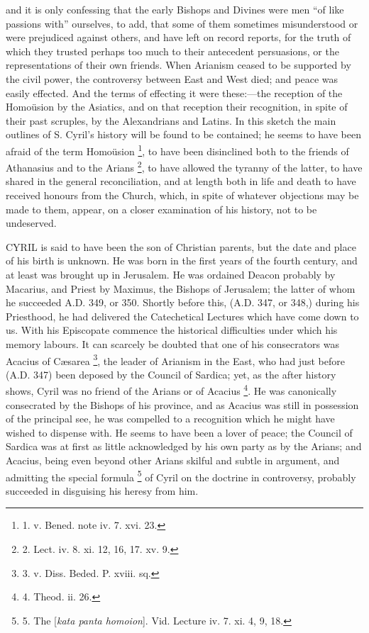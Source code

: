 and it is only confessing that the early Bishops and Divines were men ``of
like passions with'' ourselves, to add, that some of them sometimes
misunderstood or were prejudiced against others, and have left on
record reports, for the truth of which they trusted perhaps too much
to their antecedent persuasions, or the representations of their own
friends. When Arianism ceased to be supported by the civil power, the
controversy between East and West died; and peace was easily effected.
And the terms of effecting it were these:—the reception of the Homoüsion
by the Asiatics, and on that reception their recognition, in spite of
their past scruples, by the Alexandrians and Latins. In this sketch
the main outlines of S. Cyril's history will be found to be contained;
he seems to have been afraid of the term Homoüsion \footnote{1. v. Bened. note iv. 7. xvi.
23.}, to have been disinclined both to the friends of Athanasius and
to the Arians \footnote{2. Lect.
iv. 8. xi. 12, 16, 17. xv. 9.}, to have
allowed the tyranny of the latter, to have shared in the general
reconciliation, and at length both in life and death to have received
honours from the Church, which, in spite of whatever objections
may be made to them, appear, on a closer examination of his history,
not to be undeserved.

CYRIL is said to have
been the son of Christian parents, but the date and place of his birth
is unknown. He was born in the first years of the fourth century, and
at least was brought up in Jerusalem. He was ordained Deacon probably
by Macarius, and Priest by Maximus, the Bishops of Jerusalem; the
latter of whom he succeeded A.D.
349, or 350. Shortly before this, (A.D.
347, or 348,) during his Priesthood, he had delivered the Catechetical
Lectures which have come down to us. With his Episcopate commence the
historical difficulties under which his memory labours. It can
scarcely be doubted that one of his consecrators was Acacius of Cæsarea
\footnote{3. v. Diss.
Beded. P. xviii. sq.}, the leader of Arianism
in the East, who had just before (A.D. 347) been
deposed by the Council of Sardica; yet, as the after history shows,
Cyril was no friend of the Arians or of Acacius \footnote{4. Theod.
ii. 26.}. He was canonically consecrated by the Bishops of his province,
and as Acacius was still in possession of the principal see, he was
compelled to a recognition which he might have wished to dispense
with. He seems to have been a lover of peace; the Council of Sardica
was at first as little acknowledged by his own party as by the Arians;
and Acacius, being even beyond other Arians skilful and subtle in
argument, and admitting the special formula \footnote{5. The [\emph{kata
panta homoion}]. Vid. Lecture iv. 7. xi. 4, 9, 18.} of Cyril on the doctrine in controversy, probably succeeded in
disguising his heresy from him.

